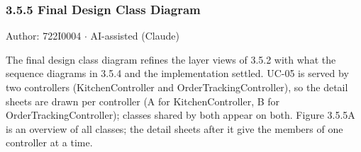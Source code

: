 \subsubsection*{3.5.5 Final Design Class Diagram}
Author: 722I0004 \ensuremath{\cdot} AI-assisted (Claude)

The final design class diagram refines the layer views of 3.5.2 with what the sequence diagrams in 3.5.4 and the implementation settled. UC-05 is served by two controllers (KitchenController and OrderTrackingController), so the detail sheets are drawn per controller (A for KitchenController, B for OrderTrackingController); classes shared by both appear on both. Figure 3.5.5A is an overview of all classes; the detail sheets after it give the members of one controller at a time.

